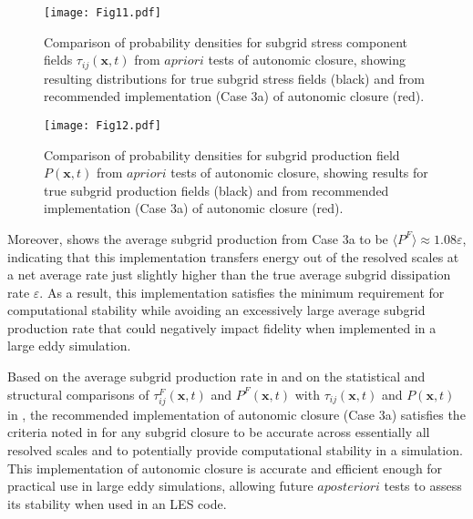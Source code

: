 %
\begin{figure}
	\begin{center}
	\texttt{[image: Fig11.pdf]}
	\caption{Comparison of probability densities for subgrid stress component fields $\tau_{ij}(\mathbf{x},t)$ from $a priori$ tests of autonomic closure, showing resulting distributions for true subgrid stress fields (black) and from recommended implementation (Case 3a) of autonomic closure (red).}
	\label{F:11}
	\end{center}
\end{figure}
%
%
%
\begin{figure}
	\begin{center}
	\texttt{[image: Fig12.pdf]}
	\caption{Comparison of probability densities for subgrid production field $P(\mathbf{x},t)$ from $a priori$ tests of autonomic closure, showing results for true subgrid production fields (black) and from recommended implementation (Case 3a) of autonomic closure (red).}
	\label{F:12}
	\end{center}
\end{figure}
%
%

Moreover,  shows the average subgrid production from Case 3a to be $\langle P^F \rangle \approx 1.08 \varepsilon$, indicating that this implementation transfers energy out of the resolved scales at a net average rate just slightly higher than the true average subgrid dissipation rate $\varepsilon$. As a result, this implementation satisfies the minimum requirement for computational stability while avoiding an excessively large average subgrid production rate that could negatively impact fidelity when implemented in a large eddy simulation.

Based on the average subgrid production rate in  and on the statistical and structural comparisons of  $\tau_{ij}^{F}(\mathbf{x},t)$ and $P^{F}(\mathbf{x},t)$  with  $\tau_{ij}(\mathbf{x},t)$ and  $P(\mathbf{x},t)$ in , the recommended implementation of autonomic closure (Case 3a) satisfies the criteria noted in  for any subgrid closure to be accurate across essentially all resolved scales and to potentially provide computational stability in a simulation. This implementation of autonomic closure is accurate and efficient enough for practical use in large eddy simulations, allowing future $a posteriori$ tests to assess its stability when used in an LES code.





% 

